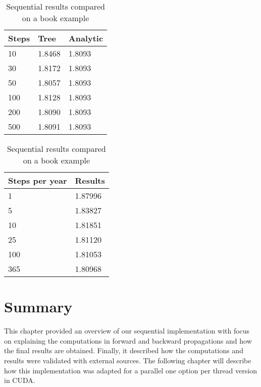 \begin{table}[h]
\centering
\caption{Sequential results compared on a book example}
\label{table:book-results}
\begin{tabular}{|lll|}
\hline
Steps & Tree   & Analytic \\ \hline
10    & 1.8468 & 1.8093   \\
30    & 1.8172 & 1.8093   \\
50    & 1.8057 & 1.8093   \\
100   & 1.8128 & 1.8093   \\
200   & 1.8090 & 1.8093   \\
500   & 1.8091 & 1.8093   \\ \hline
\end{tabular}
\begin{tabular}{|ll|}
\hline
Steps per year & Results \\ \hline
1              & 1.87996 \\
5              & 1.83827 \\
10             & 1.81851 \\
25             & 1.81120 \\
100            & 1.81053 \\
365            & 1.80968 \\ \hline
\end{tabular}
\end{table}

\section*{Summary}
This chapter provided an overview of our sequential implementation with focus on explaining  the computations in forward and backward propagations and how the final results are obtained. Finally, it described how the computations and results were validated with external sources. 
The following chapter will describe how this implementation was adapted for a parallel one option per thread version in CUDA.
